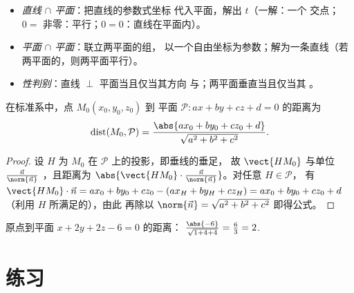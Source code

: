 \begin{method}[交集的实际求法]\label{met:g12:space:intersections}
\begin{itemize}
  \item \emph{直线 $\cap$ 平面}：把直线的参数式坐标
        代入平面，解出 $t$（一解：一个
        交点；$0 =$ 非零：平行；$0 = 0$：直线在平面内）。
  \item \emph{平面 $\cap$ 平面}：联立两平面的组，
        以一个自由坐标为参数；解为一条直线（若
        两平面的，则两平面平行）。
  \item \emph{性判别}：直线 $\perp$ 平面当且仅当其方向
        与；两平面垂直当且仅当其
        。
\end{itemize}
\end{method}

\begin{proposition}[点到平面的距离]\label{prop:g12:space:distance}
在标准系中，点 $M_0(x_0, y_0, z_0)$ 到
平面 $\mathcal P : ax + by + cz + d = 0$ 的距离为
\[
\operatorname{dist}(M_0, \mathcal P)
= \frac{\abs{ax_0 + by_0 + cz_0 + d}}{\sqrt{a^2 + b^2 + c^2}}.
\]
\end{proposition}

\begin{proof}
设 $H$ 为 $M_0$ 在 $\mathcal P$ 上的投影，即垂线的垂足，
故 $\vect{HM_0}$ 与单位
$\frac{\vec n}{\norm{\vec n}}$ ，且距离为
$\abs{\vect{HM_0}\cdot \frac{\vec n}{\norm{\vec n}}}$。对任意
$H \in \mathcal P$，
有 $\vect{HM_0}\cdot\vec n = ax_0 + by_0 + cz_0 - (ax_H + by_H + cz_H)
= ax_0 + by_0 + cz_0 + d$（利用 $H$ 所满足的），由此
再除以 $\norm{\vec n} = \sqrt{a^2+b^2+c^2}$ 即得公式。
\end{proof}

\begin{example}\label{ex:g12:space:distance}
原点到平面 $x + 2y + 2z - 6 = 0$ 的距离：
$\frac{\abs{-6}}{\sqrt{1 + 4 + 4}} = \frac63 = 2$.
\end{example}

\section{练习}

